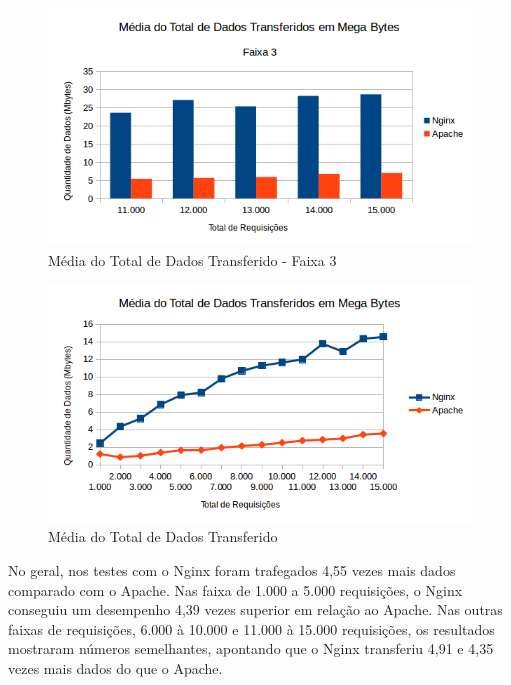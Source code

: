 \begin{figure}[H]
	\centering
	\includegraphics[width=1\linewidth]{graficos/grafico2-f3} 
	\caption{Média do Total de Dados Transferido - Faixa 3}
	\label{fig:grafico2-f3}
\end{figure}
\begin{figure}[H]
	\centering
	\includegraphics[width=1\linewidth]{graficos/grafico2} 
	\caption{Média do Total de Dados Transferido}
	\label{fig:grafico2}
\end{figure}
No geral, nos testes com o Nginx foram trafegados 4,55 vezes mais dados 
comparado com o Apache. Nas faixa de 1.000 a 5.000 requisições, o Nginx 
conseguiu um desempenho 4,39 vezes superior em relação ao Apache. Nas outras 
faixas de requisições, 6.000 à 10.000 e 11.000 à 15.000 requisições, os 
resultados mostraram números semelhantes, apontando que o Nginx transferiu 4,91 
e 4,35 vezes mais dados do que o Apache.
